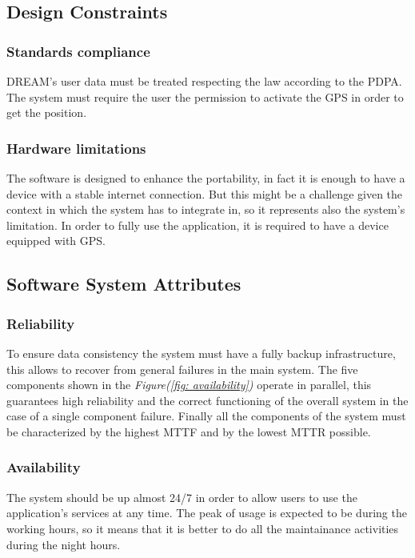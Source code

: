 \documentclass[table, 12pt]{article}
\begin{document}
\subsection{Design Constraints}

\subsubsection{Standards compliance}
DREAM's user data must be treated respecting the law according to the PDPA\cite{pdpa}.
The system must require the user the permission to activate the GPS in order to get the position.
\subsubsection{Hardware limitations}
The software is designed to enhance the portability, in fact it is enough to have a device with a stable internet connection. But this might be a challenge given the context in which the system has to integrate in, so it represents also the system's limitation.
In order to fully use the application, it is required to have a device equipped with GPS.

\subsection{Software System Attributes}
\subsubsection{Reliability}
To ensure data consistency the system must have a fully backup infrastructure, this allows to recover from general failures in the main system.
The five components shown in the \textit{Figure(\ref{fig: availability})} operate in parallel, this guarantees high reliability and the correct functioning of the overall system in the case of a single component failure.
Finally all the components of the system must be characterized by the highest MTTF and by the lowest MTTR possible.

\subsubsection{Availability}
The system should be up almost 24/7 in order to allow users to use the application's services at any time.
The peak of usage is expected to be during the working hours, so it means that it is better to do all the maintainance activities during the night hours.
\end{document}
